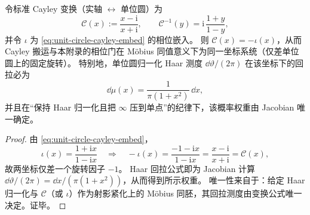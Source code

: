 \begin{corollary}\label{cor:unit-circle-cayley-haar-forces-cauchy}
令标准 Cayley 变换（实轴 \(\leftrightarrow\) 单位圆）为
\[
\mathcal{C}(x):=\frac{x-\mathrm{i}}{x+\mathrm{i}},
\qquad
\mathcal{C}^{-1}(y)=\mathrm{i}\,\frac{1+y}{1-y},
\]
并令 \(\iota\) 为 \eqref{eq:unit-circle-cayley-embed} 的相位嵌入。
则 \(\mathcal{C}(x)=-\iota(x)\)，从而 Cayley 搬运与本附录的相位门在 Möbius 同值意义下为同一坐标系统（仅差单位圆上的固定旋转）。
特别地，单位圆归一化 Haar 测度 \(\dd\vartheta/(2\pi)\) 在该坐标下的回拉必为
\[
\dd\mu(x)=\frac{1}{\pi(1+x^{2})}\,\dd x,
\]
并且在“保持 Haar 归一化且把 \(\infty\) 压到单点”的纪律下，该概率权重由 Jacobian 唯一确定。
\end{corollary}
\begin{proof}
由 \eqref{eq:unit-circle-cayley-embed}，
\[
\iota(x)=\frac{1+\mathrm{i}x}{1-\mathrm{i}x}
\quad\Longrightarrow\quad
-\iota(x)=\frac{-1-\mathrm{i}x}{1-\mathrm{i}x}
=\frac{x-\mathrm{i}}{x+\mathrm{i}}=\mathcal{C}(x),
\]
故两坐标仅差一个旋转因子 \(-1\)。
Haar 回拉公式即为 Jacobian 计算 \(\dd\vartheta/(2\pi)=\dd x/(\pi(1+x^2))\)，从而得到所示权重。
唯一性来自于：给定 Haar 归一化与 \(\mathcal{C}\)（或 \(\iota\)）作为射影紧化上的 Möbius 同胚，其回拉测度由变换公式唯一决定。证毕。
\end{proof}

